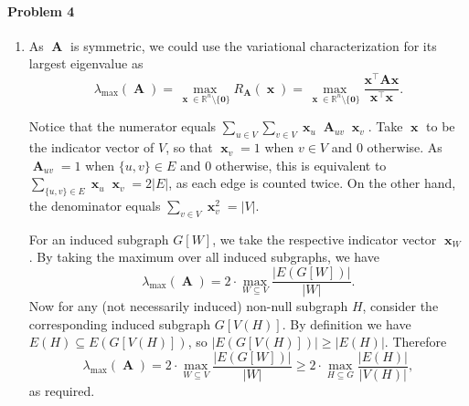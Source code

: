 \documentclass[12pt]{article}
\DeclareMathOperator{\A}{\mathbf{A}}
\DeclareMathOperator{\x}{\mathbf{x}}
\begin{document}
\paragraph{Problem 4}
\begin{enumerate}[label=\alph*., font=\bfseries]
\item As $\A$ is symmetric, we could use the variational characterization for its largest eigenvalue as $$\lambda_{\max}(\A)=\max_{\x\in\mathbb{R}^n\setminus\{\bm{0}\}}R_{\A}(\x)=\max_{\x\in\mathbb{R}^n\setminus\{\bm{0}\}}\frac{\mathbf{x^{\top}Ax}}{\mathbf{x^{\top}x}}.$$

Notice that the numerator equals $\displaystyle\sum_{u\in V}\sum_{v\in V}\x_u\A_{uv}\x_v$. Take $\x$ to be the indicator vector of $V$, so that $\x_v=1$ when $v\in V$ and $0$ otherwise. As $\A_{uv}=1$ when $\{u,v\}\in E$ and $0$ otherwise, this is equivalent to $\displaystyle\sum_{\{u,v\}\in E}\x_u\x_v=2|E|$, as each edge is counted twice. On the other hand, the denominator equals $\displaystyle\sum_{v\in V}\x_v^2=|V|$.

For an induced subgraph $G[W]$, we take the respective indicator vector $\x_W$. By taking the maximum over all induced subgraphs, we have $$\lambda_{\max}(\A)=2\cdot\max_{W\subseteq V}\frac{|E(G[W])|}{|W|}.$$
Now for any (not necessarily induced) non-null subgraph $H$, consider the corresponding induced subgraph $G[V(H)]$. By definition we have $E(H)\subseteq E(G[V(H)])$, so $|E(G[V(H)])|\ge|E(H)|$. Therefore $$\lambda_{\max}(\A)=2\cdot\max_{W\subseteq V}\frac{|E(G[W])|}{|W|}\ge2\cdot\max_{H\subseteq G}\frac{|E(H)|}{|V(H)|},$$as required.
\end{enumerate}
\end{document}

